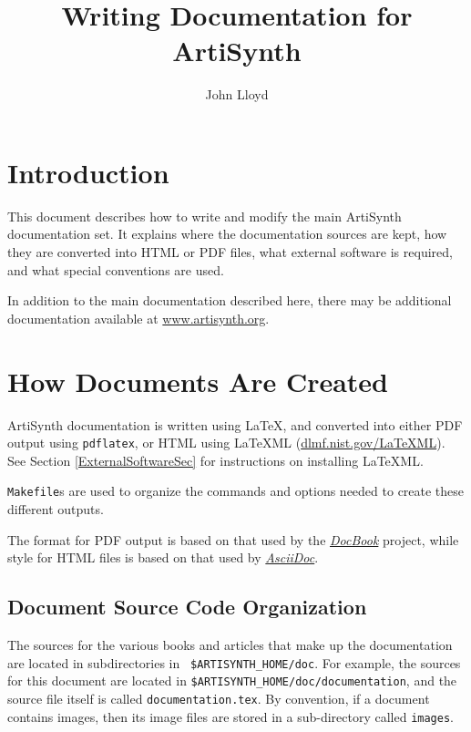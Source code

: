 \documentclass{article}
\title{Writing Documentation for ArtiSynth}
\author{John Lloyd}
\date{}
\begin{document}
\maketitle

\iflatexml{\large\today}\fi

\tableofcontents

\section{Introduction}

This document describes how to write and modify the main ArtiSynth
documentation set. It explains where the documentation sources are
kept, how they are converted into HTML or PDF files, what external
software is required, and what special conventions are used.

In addition to the main documentation described here, there may be
additional documentation available at
\href{http://www.artisynth.org}{www.artisynth.org}.

\section{How Documents Are Created}

ArtiSynth documentation is written using LaTeX, and converted into
either PDF output using {\tt pdflatex}, or HTML using LaTeXML
(\href{http://dlmf.nist.gov/LaTeXML/}{dlmf.nist.gov/LaTeXML}).  See
Section \ref{ExternalSoftwareSec} for instructions on installing LaTeXML.

{\tt Makefile}s are used to organize the commands and options needed
to create these different outputs.

The format for PDF output is based on that used by the
\href{http://www.docbook.org}{\it DocBook} project, while style for
HTML files is based on that used by
\href{http://www.methods.co.nz/asciidoc}{\it AsciiDoc}.

\subsection{Document Source Code Organization}

The sources for the various books and articles that make up the
documentation are located in subdirectories in {\tt
\$ARTISYNTH\_HOME/doc}.  For example, the sources for this document
are located in {\tt \$ARTISYNTH\_HOME/doc/documentation}, and the
source file itself is called {\tt documentation.tex}. 
By convention, if a
document contains images, then its image files are stored in a
sub-directory called {\tt images}.
\end{document}
